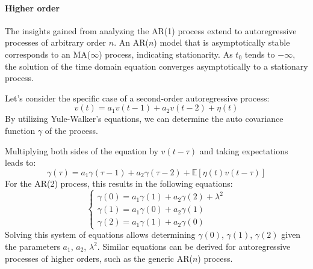 \paragraph*{Higher order}
The insights gained from analyzing the AR(1) process extend to autoregressive processes of arbitrary order $n$. 
An AR($n$) model that is asymptotically stable corresponds to an MA($\infty$) process, indicating stationarity.
As $t_0$ tends to $-\infty$, the solution of the time domain equation converges asymptotically to a stationary process.

Let's consider the specific case of a second-order autoregressive process:
\[v(t) = a_1v(t-1) + a_2v(t-2) + \eta(t)\]
By utilizing Yule-Walker's equations, we can determine the auto covariance function $\gamma$ of the process.  

Multiplying both sides of the equation by $v(t-\tau)$ and taking expectations leads to:
\[\gamma(\tau)=a_1\gamma(\tau-1)+a_2\gamma(\tau-2)+\mathbb{E}\left[ \eta(t)v(t-\tau) \right]\]
For the AR(2) process, this results in the following equations:
\[ \begin{cases}
    \gamma(0) = a_1\gamma(1) + a_2\gamma(2) + \lambda^2 \\
    \gamma(1) = a_1\gamma(0) + a_2\gamma(1) \\ 
    \gamma(2) = a_1\gamma(1) + a_2\gamma(0)
\end{cases} \]
Solving this system of equations allows determining $\gamma(0)$, $\gamma(1)$, $\gamma(2)$ given the parameters $a_1$, $a_2$, $\lambda^2$.
Similar equations can be derived for autoregressive processes of higher orders, such as the generic AR($n$) process.